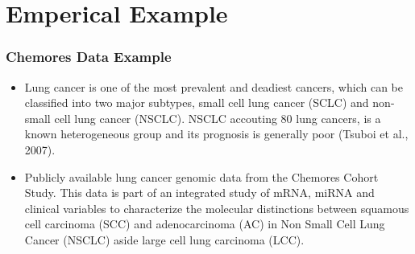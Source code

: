 \documentclass[hyperref={pdfpagelabels=false}]{beamer}
\begin{document}
\section{Emperical Example}
\begin{frame}
	\frametitle{Chemores Data Example}
	\begin{itemize}
		\item Lung cancer is one of the most prevalent and deadiest cancers, which can be classified into two major subtypes,
		small cell lung cancer (SCLC) and non-small cell lung cancer (NSCLC). NSCLC accouting 80%
		lung cancers, is a known heterogeneous group and its prognosis is generally poor (Tsuboi et al., 2007).
		\item Publicly available lung cancer genomic data from the Chemores Cohort Study. This data is part of an integrated study of mRNA, miRNA and clinical variables to characterize the molecular distinctions between squamous cell carcinoma (SCC) and adenocarcinoma (AC) in Non Small Cell Lung Cancer (NSCLC) aside large cell lung carcinoma (LCC).
	\end{itemize}
\end{frame}
\end{document}
